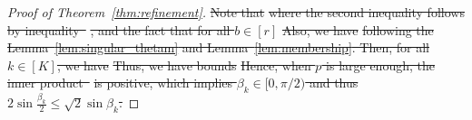 \documentclass[lettersize,onecolumn,journal]{IEEEtran}
\theoremstyle{definition}
\theoremstyle{definition}
\providecommand{\DIFdeltex}[1]{{\protect\color{red}\sout{#1}}}                      %
\providecommand{\DIFdel}[1]{\texorpdfstring{\DIFdeltex{#1}}{}} %
\begin{document}
\begin{proof}[Proof of Theorem~\ref{thm:refinement}]
\DIFdel{Note that 
    }%
\DIFdel{where the second inequality follows by inequality~}%
\DIFdel{, and the fact that for all $b \in [r]$ 
    }%
\DIFdel{Also, we have 
    }%
\DIFdel{following the Lemma~\ref{lem:singular_thetam} and Lemma~\ref{lem:membership}. Then, for all $k \in [K]$, we have 
    }%
\DIFdel{Thus, we have bounds 
    }%
\DIFdel{Hence, when $p$ is large enough, the inner product~}%
\DIFdel{is positive, which implies $\beta_k \in [0, \pi/2)$ and thus $2 \sin \frac{\beta_k}{2} \leq \sqrt{2} \sin \beta_k$.
    }%


\end{proof}
\end{document}
